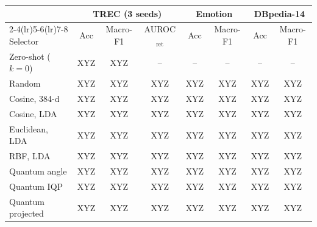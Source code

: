 \begin{tabular}{@{}l ccc cc cc@{}}
\toprule
 & \multicolumn{3}{c}{TREC (3 seeds)} & \multicolumn{2}{c}{Emotion} & \multicolumn{2}{c}{DBpedia-14} \\
\cmidrule(lr){2-4}\cmidrule(lr){5-6}\cmidrule(lr){7-8}
Selector & Acc & Macro-F1 & AUROC$_\mathrm{ret}$ & Acc & Macro-F1 & Acc & Macro-F1 \\
\midrule
Zero-shot ($k{=}0$) & XYZ & XYZ & -- & -- & -- & -- & -- \\
\midrule
Random & XYZ & XYZ & XYZ & XYZ & XYZ & XYZ & XYZ \\
Cosine, 384-d & XYZ & XYZ & XYZ & XYZ & XYZ & XYZ & XYZ \\
Cosine, LDA & XYZ & XYZ & XYZ & XYZ & XYZ & XYZ & XYZ \\
Euclidean, LDA & XYZ & XYZ & XYZ & XYZ & XYZ & XYZ & XYZ \\
RBF, LDA & XYZ & XYZ & XYZ & XYZ & XYZ & XYZ & XYZ \\
\midrule
Quantum angle & XYZ & XYZ & XYZ & XYZ & XYZ & XYZ & XYZ \\
Quantum IQP & XYZ & XYZ & XYZ & XYZ & XYZ & XYZ & XYZ \\
Quantum projected & XYZ & XYZ & XYZ & XYZ & XYZ & XYZ & XYZ \\
\bottomrule
\end{tabular}
